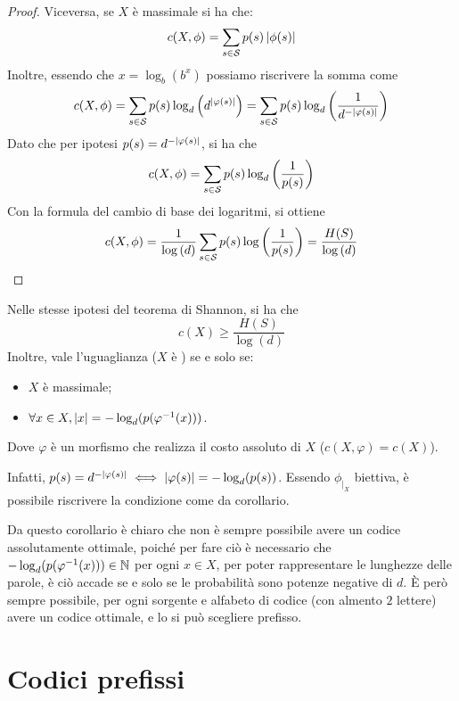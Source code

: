\begin{proof}
  Viceversa, se \(X\) è massimale si ha che:
  \[c(X,\phi) = \sum_{s \in \mathcal{S}} p(s)\left|\phi(s)\right|\]
  Inoltre, essendo che \(x = \log_{b}(b^x)\) possiamo riscrivere la somma come
  \[c(X,\phi) = \sum_{s \in \mathcal{S}} p(s)\log_{d}\left(d^{\left|\varphi(s)\right|}\right) =\sum_{s \in \mathcal{S}} p(s)\log_{d}\left(\frac{1}{d^{-\left|\varphi(s)\right|}}\right) \]
  Dato che per ipotesi \(p(s) = d^{-\left|\varphi(s)\right|}\), si ha che
  \[c(X,\phi) = \sum_{s \in \mathcal{S}} p(s)\log_{d}\left(\frac{1}{p(s)}\right) \]
  Con la formula del cambio di base dei logaritmi, si ottiene
  \[c(X,\phi) = \frac{1}{\log\left(d\right)} \sum_{s \in \mathcal{S}} p(s)\log\left(\frac{1}{p(s)}\right) = \frac{H(S)}{\log\left(d\right)}\]
\end{proof}

\begin{corollary}{}
  Nelle stesse ipotesi del teorema di Shannon, si ha che
  \[c(X) \geq \frac{H(S)}{\log(d)}\]
  Inoltre, vale l'uguaglianza (\(X\) è ) se e solo se:
  \begin{itemize}
    \item \(X\) è massimale;
    \item \(\forall x \in X, \left|x\right| = -\log_d (p(\varphi^{-1}(x)))\).
  \end{itemize}
  Dove \(\varphi\) è un morfismo che realizza il costo assoluto di \(X\) (\(c(X,\varphi) = c(X)\)).
\end{corollary}
Infatti, \(p(s) = d^{-\left|\varphi(s)\right|} \iff \left|\varphi(s)\right| = -\log_d(p(s))\). Essendo \(\phi_{|_X}\) biettiva, è possibile riscrivere la condizione come da corollario.

Da questo corollario è chiaro che non è sempre possibile avere un codice assolutamente ottimale, poiché per fare ciò è necessario che \(-\log_d (p(\varphi^{-1}(x))) \in \mathbb{N}\) per ogni \(x \in X\), per poter rappresentare le lunghezze delle parole, è ciò accade se e solo se le probabilità sono potenze negative di \(d\).
È però sempre possibile, per ogni sorgente e alfabeto di codice (con almento \(2\) lettere) avere un codice ottimale, e lo si può scegliere prefisso.

\section{Codici prefissi}

